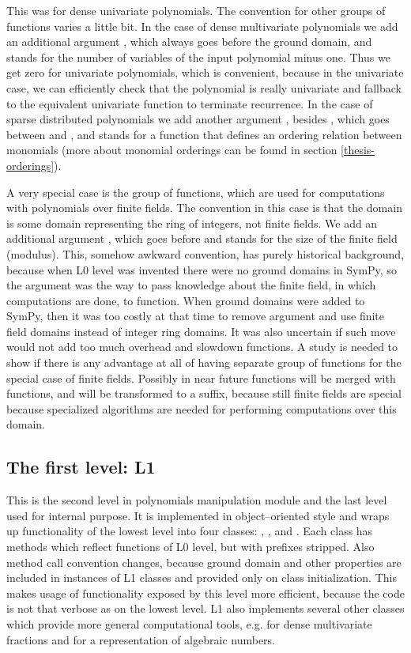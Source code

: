 This was for dense univariate polynomials. The convention for other groups of functions varies a
little bit. In the case of dense multivariate polynomials we add an additional argument , which
always goes before the ground domain, and stands for the number of variables of the input polynomial
minus one. Thus we get zero for univariate polynomials, which is convenient, because in the univariate
case, we can efficiently check that the polynomial is really univariate and fallback to the equivalent
univariate function to terminate recurrence. In the case of sparse distributed polynomials we add
another argument , besides , which goes between  and , and stands for a function
that defines an ordering relation between monomials (more about monomial orderings can be found in
section \ref{thesis-orderings}).

A very special case is the group of  functions, which are used for computations with polynomials
over finite fields. The convention in this case is that the domain  is some domain representing
the ring of integers, not finite fields. We add an additional argument , which goes before 
and stands for the size of the finite field (modulus). This, somehow awkward convention, has purely
historical background, because when L0 level was invented there were no ground domains in SymPy, so
the argument  was the way to pass knowledge about the finite field, in which computations are
done, to  function. When ground domains were added to SymPy, then it was too costly at that
time to remove argument  and use finite field domains instead of integer ring domains. It was
also uncertain if such move would not add too much overhead and slowdown  functions. A study
is needed to show if there is any advantage at all of having separate group of functions for the
special case of finite fields. Possibly in near future  functions will be merged with 
functions, and  will be transformed to a suffix, because still finite fields are special
because specialized algorithms are needed for performing computations over this domain.


\subsection{The first level: L1}

This is the second level in polynomials manipulation module and the last level used for internal
purpose. It is implemented in object--oriented style and wraps up functionality of the lowest
level into four classes: , ,  and . Each class has methods which
reflect functions of L0 level, but with prefixes stripped. Also method call convention changes,
because ground domain and other properties are included in instances of L1 classes and provided
only on class initialization. This makes usage of functionality exposed by this level more
efficient, because the code is not that verbose as on the lowest level. L1 also implements
several other classes which provide more general computational tools, e.g.  for dense
multivariate fractions and  for a representation of algebraic numbers.

